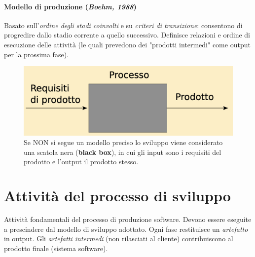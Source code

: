 \paragraph{Modello di produzione (\textit{Boehm, 1988})} Basato sull'\textit{ordine degli stadi coinvolti} e su \textit{criteri di transizione}: consentono di progredire dallo stadio corrente a quello successivo. Definisce relazioni e ordine di esecuzione delle attività (le quali prevedono dei "prodotti intermedi" come output per la prossima fase).


\begin{figure}[H]
    \centering
    \includegraphics[width=0.8\linewidth]{assets/processo_blackbox.png}
    \caption{Se NON si segue un modello preciso lo sviluppo viene considerato una scatola nera (\textbf{black box}), in cui gli input sono i requisiti del prodotto e l'output il prodotto stesso.}
\end{figure}

\newpage

\section{Attività del processo di sviluppo}
Attività fondamentali del processo di produzione software. Devono essere eseguite a prescindere dal modello di sviluppo adottato. Ogni fase restituisce un \textit{artefatto} in output. Gli \textit{artefatti intermedi} (non rilasciati al cliente) contribuiscono al prodotto finale (sistema software).

